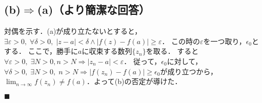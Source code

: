 \documentclass[uplatex, 12pt, dvipdfmx]{jsarticle}
\begin{document}
\subsection*{(b)$\Rightarrow$(a)（より簡潔な回答）}
対偶を示す．(a)が成り立たないとすると，$\exists\varepsilon>0,\;\forall\delta>0,\;|z-a|<\delta\land|f(z)-f(a)|\ge\varepsilon$．
この時の$\varepsilon$を一つ取り，$\epsilon_0$とする．
ここで，勝手に$a$に収束する数列$\{z_n\}$を取る．
すると$\forall\varepsilon>0,\;\exists N>0,n>N\Rightarrow|z_n-a|<\varepsilon$．
従って，$\epsilon_0$に対して，$\forall\delta>0,\;\exists N>0,\;n>N\Rightarrow|f(z_n)-f(a)|\ge\epsilon_0$が成り立つから，
$\lim_{n\to\infty}f(z_n)\ne f(a)$．よって(b)の否定が導けた．

\begin{flushright}$\blacksquare$\end{flushright}
\end{document}
